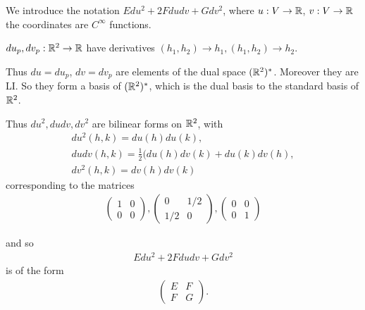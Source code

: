 \documentclass[a4paper]{article}
\begin{document}
\begin{notation}
We introduce the notation $Edu^2 + 2Fdudv + Gdv^2$, where $u:V \to \mathbb{R}$, $v:V \to \mathbb{R}$ the coordinates are $C^\infty$ functions.

$du_p, dv_p:\mathbb{R}^2 \to \mathbb{R}$ have derivatives $(h_1,h_2) \to h_1 , (h_1,h_2) \to h_2$.

Thus $du = du_p$, $dv = dv_p$ are elements of the dual space $(\mathbb{R}^2)^*$. Moreover they are LI. So they form a basis of $(\mathbb{R}^2)^*$, which is the dual basis to the standard basis of $\mathbb{R}^2$.

Thus $du^2,dudv,dv^2$ are bilinear forms on $\mathbb{R}^2$, with
\begin{equation*}
\begin{aligned}
du^2 (h,k) = du(h)du(k),\\
dudv(h,k)=\frac{1}{2}(du(h)dv(k)+du(k)dv(h),\\
dv^2(h,k) = dv(h)dv(k)
\end{aligned}
\end{equation*}
corresponding to the matrices
\begin{equation*}
\begin{aligned}
\left(\begin{matrix}
1 & 0\\
0 & 0
\end{matrix}\right),
\left(\begin{matrix}
0 & 1/2\\
1/2 & 0
\end{matrix}\right),
\left(\begin{matrix}
0 & 0\\
0 & 1
\end{matrix}\right)
\end{aligned}
\end{equation*}
\end{notation}
and so
\begin{equation*}
\begin{aligned}
Edu^2 + 2Fdudv+Gdv^2
\end{aligned}
\end{equation*}
is of the form
\begin{equation*}
\begin{aligned}
\left(\begin{matrix}
E & F\\
F & G
\end{matrix}\right).
\end{aligned}
\end{equation*}
\end{document}
